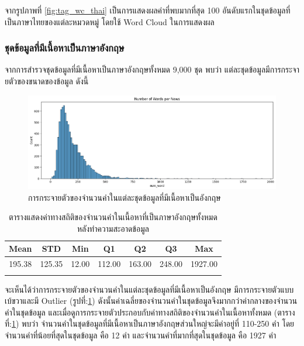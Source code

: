 \documentclass[12pt,oneside,openright,a4paper]{cpe-thai-project}
\begin{document}
        \hspace{1cm}จากรูปภาพที่ \ref{fig:tag_wc_thai} เป็นการแสดงผลคำที่พบมากที่สุด 100 อันดับแรกในชุดข้อมูลที่เป็นภาษาไทยของแต่ละหมวดหมู่ โดยใช้ Word Cloud ในการแสดงผล
        \newpage

      \subsubsection{ชุดข้อมูลที่มีเนื้อหาเป็นภาษาอังกฤษ}
        \hspace{1cm}จากการสำรวจชุดข้อมูลที่มีเนื้อหาเป็นภาษาอังกฤษทั้งหมด 9,000 ชุด พบว่า แต่ละชุดข้อมูลมีการกระจายตัวของขนาดของข้อมูล \newline ดังนี้
        \begin{figure}[!ht]\centering
          \includegraphics[width=\textwidth]{./img/eng_stat/hist_all_word.png}
          \caption{การกระจายตัวของจำนวนคำในแต่ละชุดข้อมูลที่มีเนื้อหาเป็นอังกฤษ}\label{fig:eng_hist}
        \end{figure}
        \begin{longtable}[!ht]{ccccccc}
          \caption{ตารางแสดงค่าทางสถิติของจำนวนคำในเนื้อหาที่เป็นภาษาอังกฤษทั้งหมดหลังทําความสะอาดข้อมูล}
          \label{tbl:eng_stat_all}\\
          \hhline{=======}
          \textbf{Mean} & \textbf{STD} & \textbf{Min} & \textbf{Q1} & \textbf{Q2} & \textbf{Q3} & \textbf{Max}\\ \hline
          \endhead
          195.38 & 125.35 & 12.00 & 112.00 & 163.00 & 248.00 & 1927.00  \\ \hhline{=======}
        \end{longtable}
        \hspace{1cm}จะเห็นได้ว่าการกระจายตัวของจำนวนคำในแต่ละชุดข้อมูลที่มีเนื้อหาเป็นอังกฤษ มีการกระจายตัวแบบเบ้ขวาและมี Outlier (รูปที่:\ref{fig:eng_hist}) 
        ดังนั้นค่าเฉลี่ยของจำนวนคำในชุดข้อมูลจึงมากกว่าค่ากลางของจำนวนคำในชุดข้อมูล และเมื่อดูการกระจายตัวประกอบกับค่าทางสถิติของจำนวนคำในเนื้อหาทั้งหมด
        (ตารางที่:\ref{tbl:eng_stat_all}) พบว่า จำนวนคำในชุดข้อมูลที่มีเนื้อหาเป็นภาษาอังกฤษส่วนใหญ่จะมีค่าอยู่ที่ 110-250 คำ โดยจำนวนคำที่น้อยที่สุดในชุดข้อมูล คือ 12 คำ
        และจำนวนคำที่มากที่สุดในชุดข้อมูล คือ 1927 คำ
\end{document}

